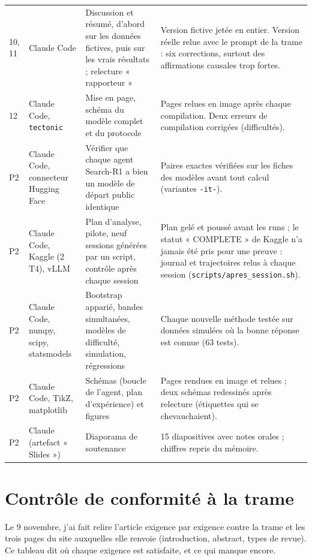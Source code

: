 \documentclass[10pt,a4paper]{article}
\newcommand{\f}[1]{\texttt{\small #1}}
\begin{document}
\begin{longtable}{@{}P{1.1cm}P{2.6cm}P{5.4cm}P{6.6cm}@{}}
10, 11 & Claude Code & Discussion et résumé, d'abord sur les données fictives, puis sur les vrais résultats ; relecture « rapporteur » & Version fictive jetée en entier. Version réelle relue avec le prompt de la trame : six corrections, surtout des affirmations causales trop fortes.\\
12 & Claude Code, \f{tectonic} & Mise en page, schéma du modèle complet et du protocole & Pages relues en image après chaque compilation. Deux erreurs de compilation corrigées (difficultés).\\
P2 & Claude Code, connecteur Hugging Face & Vérifier que chaque agent Search-R1 a bien un modèle de départ public identique & Paires exactes vérifiées sur les fiches des modèles avant tout calcul (variantes \f{-it-}).\\
P2 & Claude Code, Kaggle (2 T4), vLLM & Plan d'analyse, pilote, neuf sessions générées par un script, contrôle après chaque session & Plan gelé et poussé avant les runs ; le statut « COMPLETE » de Kaggle n'a jamais été pris pour une preuve : journal et trajectoires relus à chaque session (\f{scripts/apres\_session.sh}).\\
P2 & Claude Code, numpy, scipy, statsmodels & Bootstrap apparié, bandes simultanées, modèles de difficulté, simulation, régressions & Chaque nouvelle méthode testée sur données simulées où la bonne réponse est connue (63 tests).\\
P2 & Claude Code, TikZ, matplotlib & Schémas (boucle de l'agent, plan d'expérience) et figures & Pages rendues en image et relues ; deux schémas redessinés après relecture (étiquettes qui se chevauchaient).\\
P2 & Claude (artefact « Slides ») & Diaporama de soutenance & 15 diapositives avec notes orales ; chiffres repris du mémoire.\\
\bottomrule
\end{longtable}
\normalsize

\section{Contrôle de conformité à la trame}\label{sec:conformite}

Le 9 novembre, j'ai fait relire l'article exigence par exigence contre la trame et les trois pages du site auxquelles elle renvoie (introduction, abstract, types de revue). Ce tableau dit où chaque exigence est satisfaite, et ce qui manque encore.
\end{document}

